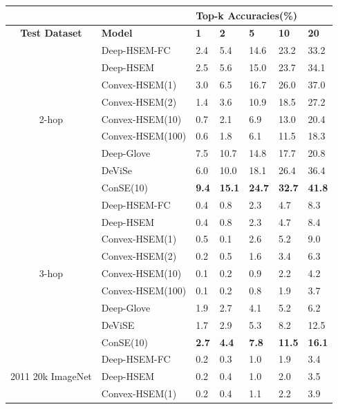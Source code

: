 \documentclass[12pt]{report}
\begin{document}
\begin{table}[]
  \centering
\begin{tabular}{cllllll}
\hline
\multicolumn{1}{r}{\textbf{}} & \textbf{} & \multicolumn{5}{l}{\textbf{Top-k Accuracies(\%)}} \\ \hline
\textbf{Test Dataset} & \textbf{Model} & \textbf{1} & \textbf{2} & \textbf{5} & \textbf{10} & \textbf{20} \\ \hline
\multirow{9}{*}{2-hop} & Deep-HSEM-FC & 2.4 & 5.4 & 14.6 & 23.2 & 33.2 \\
 & Deep-HSEM & 2.5 & 5.6 & 15.0 & 23.7 & 34.1 \\
  & Convex-HSEM(1) & 3.0 & 6.5 & 16.7 & 26.0 & 37.0 \\
 & Convex-HSEM(2) & 1.4 & 3.6 & 10.9 & 18.5 & 27.2 \\
  & Convex-HSEM(10) & 0.7 & 2.1 & 6.9 & 13.0 & 20.4 \\
 & Convex-HSEM(100) & 0.6 & 1.8 & 6.1 & 11.5 & 18.3 \\
  & Deep-Glove & 7.5 & 10.7 & 14.8 & 17.7 & 20.8 \\
  & DeViSe \cite{Frome2013} & 6.0 & 10.0 & 18.1 & 26.4 & 36.4 \\
  & ConSE(10) \cite{Norouzi2013} & \textbf{9.4} & \textbf{15.1} & \textbf{24.7} & \textbf{32.7} & \textbf{41.8} \\ \hline
\multirow{9}{*}{3-hop} & Deep-HSEM-FC & 0.4 & 0.8 & 2.3 & 4.7 & 8.3 \\
 & Deep-HSEM & 0.4 & 0.8 & 2.3 & 4.7 & 8.4 \\
  & Convex-HSEM(1) & 0.5 & 0.1 & 2.6 & 5.2 & 9.0 \\
 & Convex-HSEM(2) & 0.2 & 0.5 & 1.6 & 3.4 & 6.3 \\
  & Convex-HSEM(10) & 0.1 & 0.2 & 0.9 & 2.2 & 4.2 \\
 & Convex-HSEM(100) & 0.1 & 0.2 & 0.8 & 1.9 & 3.7 \\
  & Deep-Glove & 1.9 & 2.7 & 4.1 & 5.2 & 6.2 \\
 & DeViSE & 1.7 & 2.9 & 5.3 & 8.2 & 12.5 \\
  & ConSE(10) & \textbf{2.7} & \textbf{4.4} & \textbf{7.8} & \textbf{11.5} & \textbf{16.1} \\ \hline
  \multicolumn{1}{l}{\multirow{9}{*}{2011 20k ImageNet}} & Deep-HSEM-FC & 0.2 & 0.3 & 1.0 & 1.9 & 3.4 \\
  \multicolumn{1}{l}{} & Deep-HSEM & 0.2 & 0.4 & 1.0 & 2.0 & 3.5 \\
  \multicolumn{1}{l}{} & Convex-HSEM(1) & 0.2 & 0.4 & 1.1 & 2.2 & 3.9 \\

\end{tabular}
\end{table}
\end{document}
